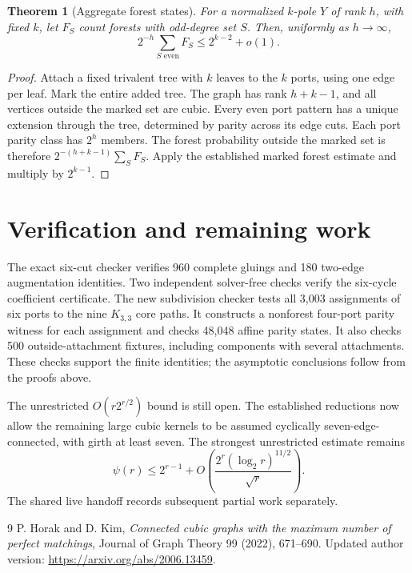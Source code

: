 \documentclass[11pt]{article}
\newtheorem{theorem}{Theorem}[section]
\begin{document}
\begin{theorem}[Aggregate forest states]\label{thm:fixed-port-aggregate}
For a normalized $k$-pole $Y$ of rank $h$, with fixed $k$, let $F_S$ count forests with odd-degree set $S$.
Then, uniformly as $h\to\infty$,
\[
 2^{-h}\sum_{S\text{ even}}F_S\le2^{k-2}+o(1).
\]
\end{theorem}
\begin{proof}
Attach a fixed trivalent tree with $k$ leaves to the $k$ ports, using one edge per leaf.
Mark the entire added tree.
The graph has rank $h+k-1$, and all vertices outside the marked set are cubic.
Every even port pattern has a unique extension through the tree, determined by parity across its edge cuts.
Each port parity class has $2^h$ members.
The forest probability outside the marked set is therefore $2^{-(h+k-1)}\sum_SF_S$.
Apply the established marked forest estimate and multiply by $2^{k-1}$.
\end{proof}









\section{Verification and remaining work}
The exact six-cut checker verifies 960 complete gluings and 180 two-edge augmentation identities.
Two independent solver-free checks verify the six-cycle coefficient certificate.
The new subdivision checker tests all 3,003 assignments of six ports to the nine $K_{3,3}$ core paths.
It constructs a nonforest four-port parity witness for each assignment and checks 48,048 affine parity states.
It also checks 500 outside-attachment fixtures, including components with several attachments.
These checks support the finite identities; the asymptotic conclusions follow from the proofs above.

The unrestricted $O(r2^{r/2})$ bound is still open.
The established reductions now allow the remaining large cubic kernels to be assumed cyclically seven-edge-connected, with girth at least seven.
The strongest unrestricted estimate remains
\[
 \psi(r)\le2^{r-1}+O\!\left(\frac{2^r(\log_2 r)^{11/2}}{\sqrt r}\right).
\]
The shared live handoff records subsequent partial work separately.
\begin{thebibliography}{9}
 P. Horak and D. Kim, \emph{Connected cubic graphs with the maximum number of perfect matchings}, Journal of Graph Theory 99 (2022), 671--690. Updated author version: \url{https://arxiv.org/abs/2006.13459}.
\end{thebibliography}
\end{document}
